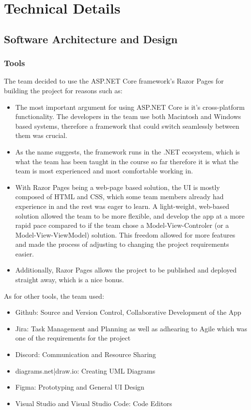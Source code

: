 \documentclass[12pt]{report}
\begin{document}
\chapter{Technical Details}

\section{Software Architecture and Design}

\subsection*{Tools}
The team decided to use the ASP.NET Core framework's Razor Pages for building the project for reasons such as:
\begin{itemize}
  \item The most important argument for using ASP.NET Core is it's cross-platform functionality. The developers in the team use 
  both Macintosh and Windows based systems, therefore a framework that could switch seamlessly between them was crucial.
  \item As the name suggests, the framework runs in the .NET ecosystem, which is what the team has been taught in the course so far
  therefore it is what the team is most experienced and most comfortable working in.
  \item With Razor Pages being a web-page based solution, the UI is mostly composed of HTML and CSS, which some team members already
  had experience in and the rest was eager to learn. A light-weight, web-based solution allowed the team to be more flexible,
  and develop the app at a more rapid pace compared to if the team chose a Model-View-Controler (or a Model-View-ViewModel) solution.
  This freedom allowed for more features and made the process of adjusting to changing the project requirements easier.
  \item Additionally, Razor Pages allows the project to be published and deployed straight away, which is a nice bonus.
\end{itemize}
As for other tools, the team used:
\begin{itemize}
  \item Github: Source and Version Control, Collaborative Development of the App
  \item Jira: Task Management and Planning as well as adhearing to Agile which was one of the requirements for the project
  \item Discord: Communication and Resource Sharing
  \item diagrams.net|draw.io: Creating UML Diagrams 
  \item Figma: Prototyping and General UI Design
  \item Visual Studio and Visual Studio Code: Code Editors
\end{itemize}
\end{document}
